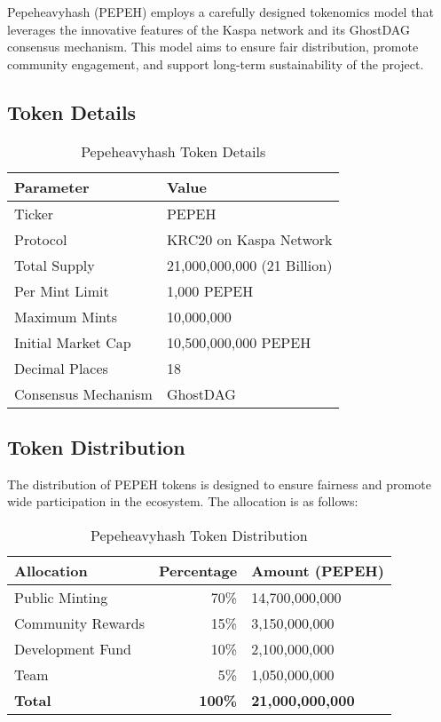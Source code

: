 \documentclass{article}
\begin{document}
Pepeheavyhash (PEPEH) employs a carefully designed tokenomics model that leverages the innovative features of the Kaspa network and its GhostDAG consensus mechanism. This model aims to ensure fair distribution, promote community engagement, and support long-term sustainability of the project.

\subsection{Token Details}

\begin{table}[h]
\centering
\begin{tabular}{|l|l|}
\hline
\textbf{Parameter} & \textbf{Value} \\
\hline
Ticker & PEPEH \\
Protocol & KRC20 on Kaspa Network \\
Total Supply & 21,000,000,000 (21 Billion) \\
Per Mint Limit & 1,000 PEPEH \\
Maximum Mints & 10,000,000 \\
Initial Market Cap & 10,500,000,000 PEPEH \\
Decimal Places & 18 \\
Consensus Mechanism & GhostDAG \\
\hline
\end{tabular}
\caption{Pepeheavyhash Token Details}
\end{table}

\subsection{Token Distribution}

The distribution of PEPEH tokens is designed to ensure fairness and promote wide participation in the ecosystem. The allocation is as follows:

\begin{table}[h]
\centering
\begin{tabular}{|l|r|l|}
\hline
\textbf{Allocation} & \textbf{Percentage} & \textbf{Amount (PEPEH)} \\
\hline
Public Minting & 70\% & 14,700,000,000 \\
Community Rewards & 15\% & 3,150,000,000 \\
Development Fund & 10\% & 2,100,000,000 \\
Team & 5\% & 1,050,000,000 \\
\hline
\textbf{Total} & \textbf{100\%} & \textbf{21,000,000,000} \\
\hline
\end{tabular}
\caption{Pepeheavyhash Token Distribution}
\end{table}
\end{document}
